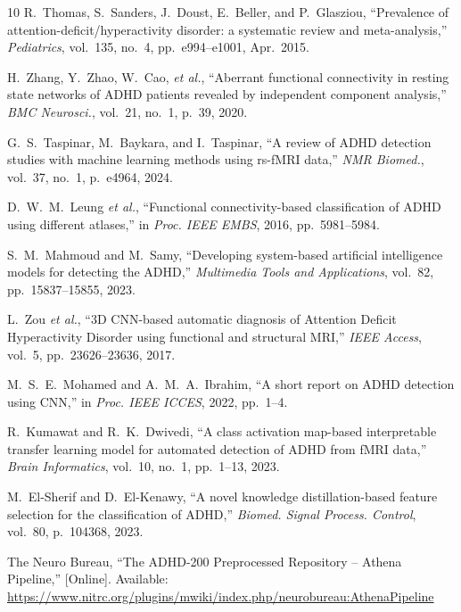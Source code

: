 \documentclass[conference]{IEEEtran}
\begin{document}
\begin{thebibliography}{10}
\small
\setlength{\itemsep}{0pt}
\setlength{\parskip}{0pt}
R.~Thomas, S.~Sanders, J.~Doust, E.~Beller, and P.~Glasziou, ``Prevalence of attention-deficit/hyperactivity disorder: a systematic review and meta-analysis,'' \textit{Pediatrics}, vol.~135, no.~4, pp.~e994--e1001, Apr.~2015.

H.~Zhang, Y.~Zhao, W.~Cao, \textit{et al.}, ``Aberrant functional connectivity in resting state networks of ADHD patients revealed by independent component analysis,'' \textit{BMC Neurosci.}, vol.~21, no.~1, p.~39, 2020.

G.~S.~Taspinar, M.~Baykara, and I.~Taspinar, ``A review of ADHD detection studies with machine learning methods using rs-fMRI data,'' \textit{NMR Biomed.}, vol.~37, no.~1, p.~e4964, 2024.

D.~W.~M.~Leung \textit{et al.}, ``Functional connectivity-based classification of ADHD using different atlases,'' in \textit{Proc. IEEE EMBS}, 2016, pp.~5981--5984.

S.~M.~Mahmoud and M.~Samy, ``Developing system-based artificial intelligence models for detecting the ADHD,'' \textit{Multimedia Tools and Applications}, vol.~82, pp.~15837--15855, 2023.

L.~Zou \textit{et al.}, ``3D CNN-based automatic diagnosis of Attention Deficit Hyperactivity Disorder using functional and structural MRI,'' \textit{IEEE Access}, vol.~5, pp.~23626--23636, 2017.

M.~S.~E.~Mohamed and A.~M.~A.~Ibrahim, ``A short report on ADHD detection using CNN,'' in \textit{Proc. IEEE ICCES}, 2022, pp.~1--4.

R.~Kumawat and R.~K.~Dwivedi, ``A class activation map-based interpretable transfer learning model for automated detection of ADHD from fMRI data,'' \textit{Brain Informatics}, vol.~10, no.~1, pp.~1--13, 2023.

M.~El-Sherif and D.~El-Kenawy, ``A novel knowledge distillation-based feature selection for the classification of ADHD,'' \textit{Biomed. Signal Process. Control}, vol.~80, p.~104368, 2023.

The Neuro Bureau, ``The ADHD-200 Preprocessed Repository -- Athena Pipeline,'' [Online]. Available: \url{https://www.nitrc.org/plugins/mwiki/index.php/neurobureau:AthenaPipeline}

\end{thebibliography}
\end{document}
